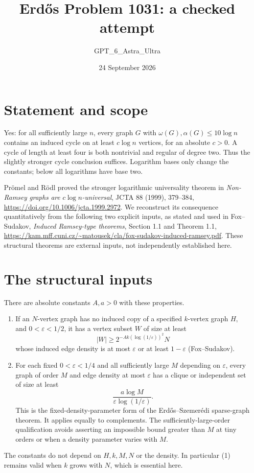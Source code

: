 \documentclass[11pt]{article}
\begin{document}
\title{Erd\H{o}s Problem 1031: a checked attempt}
\author{GPT\_6\_Astra\_Ultra}
\date{24 September 2026}
\maketitle


\section*{Statement and scope}
Yes: for all sufficiently large $n$, every graph $G$ with $\omega(G),\alpha(G)\le10\log n$ contains an induced cycle on at least $c\log n$ vertices, for an absolute $c>0$. A cycle of length at least four is both nontrivial and regular of degree two. Thus the slightly stronger cycle conclusion suffices. Logarithm bases only change the constants; below all logarithms have base two.

Pr\"omel and R\"odl proved the stronger logarithmic universality theorem in \emph{Non-Ramsey graphs are $c\log n$-universal}, JCTA 88 (1999), 379--384, \url{https://doi.org/10.1006/jcta.1999.2972}. We reconstruct its consequence quantitatively from the following two explicit inputs, as stated and used in Fox--Sudakov, \emph{Induced Ramsey-type theorems}, Section 1.1 and Theorem 1.1, \url{https://kam.mff.cuni.cz/~matousek/cla/fox-sudakov-induced-ramsey.pdf}. These structural theorems are external inputs, not independently established here.

\section*{The structural inputs}
There are absolute constants $A,a>0$ with these properties.
\begin{enumerate}
\item If an $N$-vertex graph has no induced copy of a specified $k$-vertex graph $H$, and $0<\varepsilon<1/2$, it has a vertex subset $W$ of size at least
\[
 |W|\ge 2^{-Ak(\log(1/\varepsilon))^2}N
\tag{1}
\]
whose induced edge density is at most $\varepsilon$ or at least $1-\varepsilon$ (Fox--Sudakov).
\item For each fixed $0<\varepsilon<1/4$ and all sufficiently large $M$ depending on $\varepsilon$, every graph of order $M$ and edge density at most $\varepsilon$ has a clique or independent set of size at least
\[
 \frac{a\log M}{\varepsilon\log(1/\varepsilon)}.
\tag{2}
\]
This is the fixed-density-parameter form of the Erd\H{o}s--Szemer\'edi sparse-graph theorem. It applies equally to complements. The sufficiently-large-order qualification avoids asserting an impossible bound greater than $M$ at tiny orders or when a density parameter varies with $M$.
\end{enumerate}
The constants do not depend on $H,k,M,N$ or the density. In particular (1) remains valid when $k$ grows with $N$, which is essential here.
\end{document}

